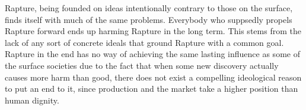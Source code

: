 \documentclass{article}
\begin{document}
Rapture, being founded on ideas intentionally contrary to those on the surface, finds itself
with much of the same problems. Everybody who suppsedly propels Rapture forward ends up harming Rapture in
the long term. This stems from the lack of any sort of concrete ideals that ground Rapture with a common goal. 
Rapture in the end has no way of achieving the same lasting influence as some of the surface societies due to 
the fact that when some new discovery actually causes more harm than good, there does not exist a compelling
ideological reason to put an end to it, since production and the market take a higher position than human 
dignity. 


\printbibliography 
\end{document}
